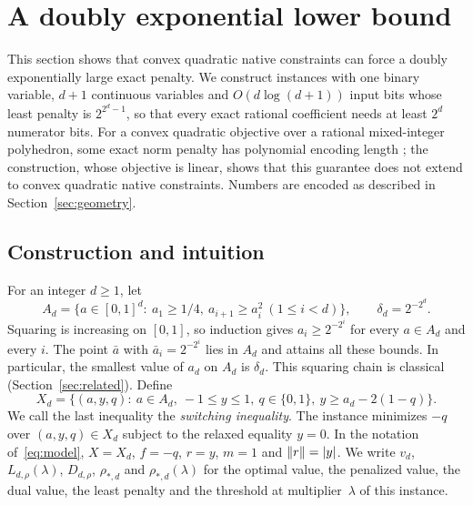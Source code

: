 \section{A doubly exponential lower bound}\label{sec:lower}
This section shows that convex quadratic native constraints can force a
doubly exponentially large exact penalty. We construct instances with one
binary variable, $d+1$ continuous variables and $O(d\log(d+1))$ input bits
whose least penalty is $2^{2^d-1}$, so that every exact rational
coefficient needs at least $2^d$ numerator bits. For a convex quadratic objective over a rational mixed-integer
polyhedron, some exact norm penalty has polynomial encoding length
\citep[Theorem~11]{GuAhmedDey2020}; the construction, whose objective is
linear, shows that this guarantee does not extend to convex quadratic
native constraints. Numbers are encoded as described in
Section~\ref{sec:geometry}.

\subsection{Construction and intuition}
For an integer $d\ge1$, let
\begin{equation}\label{eq:chain}
 A_d=\{a\in[0,1]^d:\ a_1\ge1/4,\ a_{i+1}\ge a_i^2\ (1\le i<d)\},
 \qquad \delta_d=2^{-2^d}.
\end{equation}
Squaring is increasing on $[0,1]$, so induction gives $a_i\ge2^{-2^i}$
for every $a\in A_d$ and every $i$. The point $\bar a$ with
$\bar a_i=2^{-2^i}$ lies in $A_d$ and attains all these bounds. In
particular, the smallest value of $a_d$ on $A_d$ is $\delta_d$. This
squaring chain is classical (Section~\ref{sec:related}). Define
\begin{equation}\label{eq:onebinary}
 X_d=\{(a,y,q):\ a\in A_d,\ -1\le y\le1,\ q\in\{0,1\},\
                  y\ge a_d-2(1-q)\}.
\end{equation}
We call the last inequality the \emph{switching inequality}. The instance
minimizes $-q$ over $(a,y,q)\in X_d$ subject to the relaxed equality $y=0$.
In the notation of~\eqref{eq:model}, $X=X_d$, $f=-q$, $r=y$, $m=1$ and
$\lVert r\rVert=|y|$. We write $v_d$, $L_{d,\rho}(\lambda)$, $D_{d,\rho}$,
$\rho_{*,d}$ and $\rho_{*,d}(\lambda)$ for the optimal value, the penalized
value, the dual value, the least penalty and the threshold at
multiplier~$\lambda$ of this instance.

